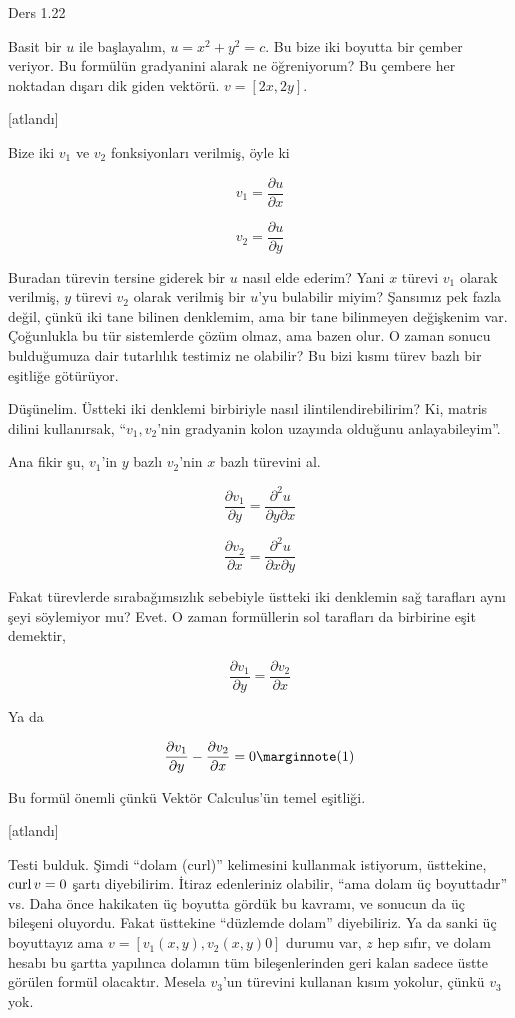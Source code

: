 \documentclass[12pt,fleqn]{article}\usepackage{../../common}
\begin{document}
Ders 1.22

Basit bir $u$ ile başlayalım, $u = x^2 + y^2 = c$. Bu bize iki boyutta bir
çember veriyor. Bu formülün gradyanini alarak ne öğreniyorum? Bu çembere her
noktadan dışarı dik giden vektörü. $v = [2x, 2y]$.

[atlandı]

Bize iki $v_1$ ve $v_2$ fonksiyonları verilmiş, öyle ki

$$
v_1 = \frac{\partial u}{\partial x}
$$

$$
v_2 = \frac{\partial u}{\partial y}
$$

Buradan türevin tersine giderek bir $u$ nasıl elde ederim? Yani $x$ türevi $v_1$
olarak verilmiş, $y$ türevi $v_2$ olarak verilmiş bir $u$'yu bulabilir miyim?
Şansımız pek fazla değil, çünkü iki tane bilinen denklemim, ama bir tane
bilinmeyen değişkenim var. Çoğunlukla bu tür sistemlerde çözüm olmaz, ama bazen
olur. O zaman sonucu bulduğumuza dair tutarlılık testimiz ne olabilir?
Bu bizi kısmı türev bazlı bir eşitliğe götürüyor.

Düşünelim. Üstteki iki denklemi birbiriyle nasıl ilintilendirebilirim? Ki,
matris dilini kullanırsak, ``$v_1,v_2$'nin gradyanin kolon uzayında olduğunu
anlayabileyim''. 

Ana fikir şu, $v_1$'in $y$ bazlı $v_2$'nin $x$ bazlı türevini al.

$$
\frac{\partial v_1}{\partial y} = \frac{\partial^2 u}{\partial y \partial x}
$$

$$
\frac{\partial v_2}{\partial x} = \frac{\partial^2 u}{\partial x \partial y}
$$

Fakat türevlerde sırabağımsızlık sebebiyle üstteki iki denklemin sağ tarafları
aynı şeyi söylemiyor mu? Evet. O zaman formüllerin sol tarafları da birbirine
eşit demektir,

$$
\frac{\partial v_1}{\partial y} = \frac{\partial v_2}{\partial x} 
$$

Ya da

$$
\frac{\partial v_1}{\partial y} - \frac{\partial v_2}{\partial x} = 0
\mlabel{1}
$$

Bu formül önemli çünkü Vektör Calculus'ün temel eşitliği.

[atlandı]

Testi bulduk. Şimdi ``dolam (curl)'' kelimesini kullanmak istiyorum, üsttekine,
$\operatorname{curl} v = 0$ şartı diyebilirim. İtiraz edenleriniz olabilir, ``ama dolam üç
boyuttadır'' vs. Daha önce hakikaten üç boyutta gördük bu kavramı, ve sonucun da
üç bileşeni oluyordu. Fakat üsttekine ``düzlemde dolam'' diyebiliriz.  Ya da
sanki üç boyuttayız ama $v = [v_1(x,y), v_2(x,y) 0]$ durumu var, $z$ hep sıfır,
ve dolam hesabı bu şartta yapılınca dolamın tüm bileşenlerinden geri kalan
sadece üstte görülen formül olacaktır. Mesela $v_3$'un türevini kullanan kısım
yokolur, çünkü $v_3$ yok.
\end{document}
